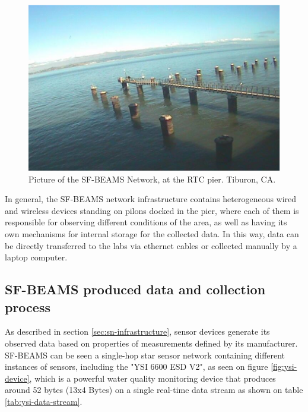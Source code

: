 \begin{figure}[!b]
  \centering
    \includegraphics[scale=0.7]{../diagrams/cam_image-oct15}
  \caption{Picture of the SF-BEAMS Network, at the RTC pier. Tiburon, CA.}
  \label{fig:sf-beams}
\end{figure}

In general, the SF-BEAMS network infrastructure contains heterogeneous wired and
wireless devices standing on pilons docked in the pier, where each of them is
responsible for observing different conditions of the area, as well as having
its own mechanisms for internal storage for the collected data. In this way,
data can be directly transferred to the labs via ethernet cables or collected
manually by a laptop computer.

\subsection{SF-BEAMS produced data and collection process}
\label{sec:sfbeams}

As described in section \ref{sec:sn-infrastructure}, sensor devices generate
its observed data based on properties of measurements defined by its
manufacturer. SF-BEAMS can be seen a single-hop star sensor network containing
different instances of sensors, including the "YSI 6600 ESD V2", as seen on
figure \ref{fig:ysi-device}, which is a powerful water quality monitoring
device that produces around 52 bytes (13x4 Bytes) on a single real-time data
stream as shown on table \ref{tab:ysi-data-stream}.


